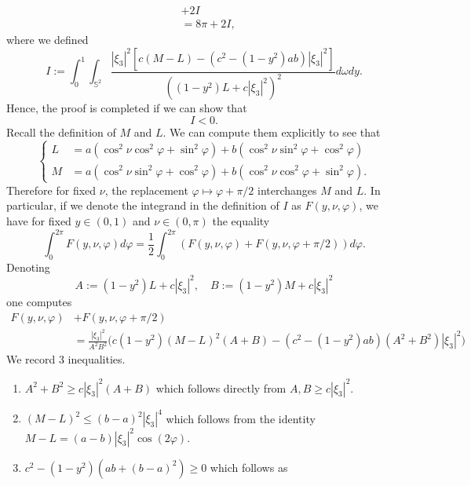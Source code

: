 \documentclass[11pt]{article}
\theoremstyle{plain}
\numberwithin{equation}{section}
\theoremstyle{definition}
\let\oldendproof\endproof
\renewenvironment{proof}[1][\proofname]{%
\oldproof[\upshape \bfseries #1]%
}{\oldendproof}
\def \mb{\mathbb}
\begin{document}
\begin{proof}
\begin{align*}
        &+2 I\\
        &=8\pi +2I,
    \end{align*}
    where we defined
    \[
    I:=\int_0^1\int_{\mb S^2}\frac{|\xi_3|^2\left[c(M-L)-(c^2-(1-y^2)ab)|\xi_3|^2\right]}{((1-y^2)L+c|\xi_3|^2)^2}d\omega dy.
    \]
    Hence, the proof is completed if we can show that
    \begin{equation}
        \label{eqInequalityforI}
        I<0.
    \end{equation}
    Recall the definition of $M$ and $L$. We can compute them explicitly to see that
    \begin{equation}
        \label{explicitMandL}
        \begin{cases}
            L&=a(\cos^2\nu\cos^2\varphi+\sin^2\varphi)+b(\cos^2\nu\sin^2\varphi+\cos^2\varphi)\\
            M&=a(\cos^2\nu\sin^2\varphi+\cos^2\varphi)+b(\cos^2\nu\cos^2\varphi+\sin^2\varphi).
        \end{cases}
    \end{equation}
    Therefore for fixed $\nu$, the replacement $\varphi \mapsto \varphi+\pi/2$ interchanges $M$ and $L$. In particular, if we denote the integrand in the definition of $I$ as $F(y,\nu,\varphi)$, we have for fixed $y \in (0,1)$ and $\nu \in (0,\pi)$ the equality
    \begin{equation}
        \label{splittingThroughIntegrand}
        \int_{0}^{2\pi}F(y,\nu,\varphi)d\varphi=\frac{1}{2}\int_{0}^{2\pi}(F(y,\nu,\varphi)+F(y,\nu,\varphi+\pi/2))d\varphi.
    \end{equation}
    Denoting
    \[
    A:=(1-y^2)L+c|\xi_3|^2,\quad B:=(1-y^2)M+c|\xi_3|^2
    \]
    one computes
    \begin{align}
        \label{eq:ExpressionOfIntegrand}
        F(y,\nu,\varphi)&+F(y,\nu,\varphi+\pi/2) \nonumber
        \\&=\frac{|\xi_3|^2}{A^2B^2}\big(c(1-y^2)(M-L)^2(A+B)-(c^2-(1-y^2)ab)(A^2+B^2)|\xi_3|^2\big)
    \end{align}
    We record 3 inequalities.
    \begin{enumerate}
        \item \label{ineq:it1} $A^2+B^2 \geq c |\xi_3|^2(A+B)$ which follows directly from $A,B\geq c|\xi_3|^2$.
        \item \label{ineq:it2} $(M-L)^2\leq (b-a)^2|\xi_3|^4$ which follows from the identity $M-L=(a-b)|\xi_3|^2\cos(2\varphi)$.
        \item \label{ineq:it3} $c^2-(1-y^2)(ab+(b-a)^2)\geq 0$ which follows as

\end{enumerate}
\end{proof}
\end{document}

